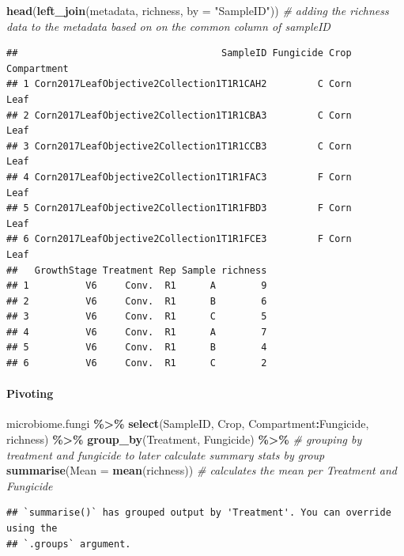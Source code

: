 \documentclass[
]{article}
\newenvironment{Shaded}{\begin{snugshade}}{\end{snugshade}}
\newcommand{\AttributeTok}[1]{\textcolor[rgb]{0.13,0.29,0.53}{#1}}
\newcommand{\CommentTok}[1]{\textcolor[rgb]{0.56,0.35,0.01}{\textit{#1}}}
\newcommand{\FunctionTok}[1]{\textcolor[rgb]{0.13,0.29,0.53}{\textbf{#1}}}
\newcommand{\NormalTok}[1]{#1}
\newcommand{\SpecialCharTok}[1]{\textcolor[rgb]{0.81,0.36,0.00}{\textbf{#1}}}
\newcommand{\StringTok}[1]{\textcolor[rgb]{0.31,0.60,0.02}{#1}}
\begin{document}
\begin{Shaded}
\begin{Highlighting}[]
\FunctionTok{head}\NormalTok{(}\FunctionTok{left\_join}\NormalTok{(metadata, richness, }\AttributeTok{by =} \StringTok{"SampleID"}\NormalTok{)) }\CommentTok{\# adding the richness data to the metadata based on on the common column of sampleID}
\end{Highlighting}
\end{Shaded}

\begin{verbatim}
##                                    SampleID Fungicide Crop Compartment
## 1 Corn2017LeafObjective2Collection1T1R1CAH2         C Corn        Leaf
## 2 Corn2017LeafObjective2Collection1T1R1CBA3         C Corn        Leaf
## 3 Corn2017LeafObjective2Collection1T1R1CCB3         C Corn        Leaf
## 4 Corn2017LeafObjective2Collection1T1R1FAC3         F Corn        Leaf
## 5 Corn2017LeafObjective2Collection1T1R1FBD3         F Corn        Leaf
## 6 Corn2017LeafObjective2Collection1T1R1FCE3         F Corn        Leaf
##   GrowthStage Treatment Rep Sample richness
## 1          V6     Conv.  R1      A        9
## 2          V6     Conv.  R1      B        6
## 3          V6     Conv.  R1      C        5
## 4          V6     Conv.  R1      A        7
## 5          V6     Conv.  R1      B        4
## 6          V6     Conv.  R1      C        2
\end{verbatim}

\paragraph{Pivoting}\label{pivoting}

\begin{Shaded}
\begin{Highlighting}[]
\NormalTok{microbiome.fungi }\SpecialCharTok{\%\textgreater{}\%}
  \FunctionTok{select}\NormalTok{(SampleID, Crop, Compartment}\SpecialCharTok{:}\NormalTok{Fungicide, richness) }\SpecialCharTok{\%\textgreater{}\%} 
  \FunctionTok{group\_by}\NormalTok{(Treatment, Fungicide) }\SpecialCharTok{\%\textgreater{}\%} \CommentTok{\# grouping by treatment and fungicide to later calculate summary stats by group}
  \FunctionTok{summarise}\NormalTok{(}\AttributeTok{Mean =} \FunctionTok{mean}\NormalTok{(richness)) }\CommentTok{\# calculates the mean per Treatment and Fungicide }
\end{Highlighting}
\end{Shaded}

\begin{verbatim}
## `summarise()` has grouped output by 'Treatment'. You can override using the
## `.groups` argument.
\end{verbatim}
\end{document}
